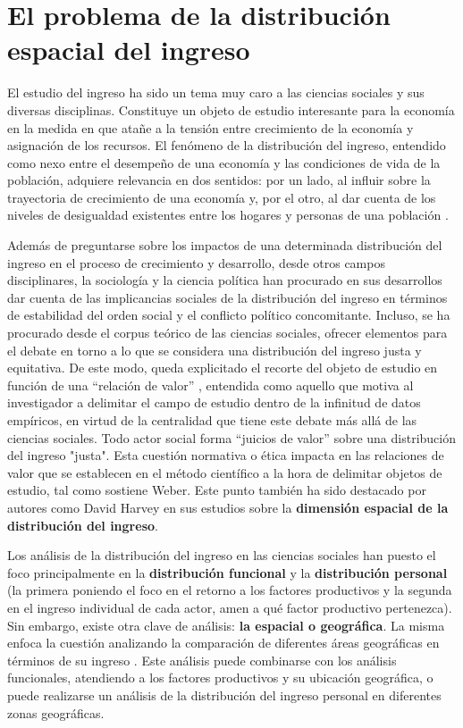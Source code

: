 
	\section{El problema de la distribución espacial del ingreso}
	
El estudio del ingreso ha sido un tema muy caro a las ciencias sociales y sus diversas disciplinas. Constituye un objeto de estudio interesante para la economía en la medida en que atañe a la tensión entre crecimiento de la economía y asignación de los recursos. El fenómeno de la distribución del ingreso, entendido como nexo entre el desempeño de una economía y las condiciones de vida de la población, adquiere relevancia en dos sentidos: por un lado, al influir sobre la trayectoria de crecimiento de una economía y, por el otro, al dar cuenta de los niveles de desigualdad existentes entre los hogares y personas de una población \cite{giayetto}. 

Además de preguntarse sobre los impactos de una determinada distribución del ingreso en el proceso de crecimiento y desarrollo, desde otros campos disciplinares, la sociología y la ciencia política han procurado en sus desarrollos dar cuenta de las implicancias sociales de la distribución del ingreso en términos de estabilidad del orden social y el conflicto político concomitante. Incluso, se ha procurado desde el corpus teórico de las ciencias sociales, ofrecer elementos para el debate en torno a lo que se considera una distribución del ingreso justa y equitativa. De este modo, queda explicitado el recorte del objeto de estudio en función de una “relación de valor” \cite{weber}, entendida como aquello que motiva al investigador a delimitar el campo de estudio dentro de la infinitud de datos empíricos, en virtud de la centralidad que tiene este debate más allá de las ciencias sociales. Todo actor social forma “juicios de valor” \cite{weber} sobre una distribución del ingreso "justa". Esta cuestión normativa o ética impacta en las relaciones de valor que se establecen en el método científico a la hora de delimitar objetos de estudio, tal como sostiene Weber. Este punto también ha sido destacado por autores como David Harvey \citeyear{harvey} en sus estudios sobre la \textbf{dimensión espacial de la distribución del ingreso}. 

Los análisis de la distribución del ingreso en las ciencias sociales han puesto el foco principalmente en la \textbf{distribución funcional} y la \textbf{distribución personal} (la primera poniendo el foco en el retorno a los factores productivos y la segunda en el ingreso individual de cada actor, amen a qué factor productivo pertenezca). Sin embargo, existe otra clave de análisis: \textbf{la espacial o geográfica}. La misma enfoca la cuestión analizando la comparación de diferentes áreas geográficas en términos de su ingreso \cite{gasparini2001}. Este análisis puede combinarse con los análisis funcionales, atendiendo a los factores productivos y su ubicación geográfica, o puede realizarse un análisis de la distribución del ingreso personal en diferentes zonas geográficas. 

